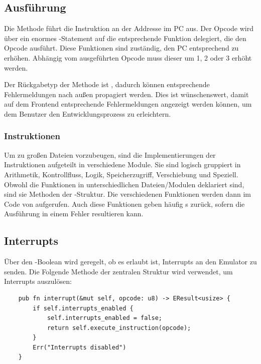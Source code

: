 \subsection{Ausführung}

Die  Methode führt die Instruktion an der Addresse im PC aus. Der Opcode wird über ein enormes -Statement auf die entsprechende Funktion delegiert, die den Opcode ausführt. Diese Funktionen sind zuständig, den \ac{PC} entsprechend zu erhöhen. Abhängig vom ausgeführten Opcode muss dieser um 1, 2 oder 3 erhöht werden.

Der Rückgabetyp der Methode ist , dadurch können entsprechende Fehlermeldungen nach außen propagiert werden. Dies ist wünschenswert, damit auf dem Frontend entsprechende Fehlermeldungen angezeigt werden können, um dem Benutzer den Entwicklungsprozess zu erleichtern.

\subsubsection{Instruktionen}

Um zu großen Dateien vorzubeugen, sind die Implementierungen der Instruktionen aufgeteilt in verschiedene Module. Sie sind logisch gruppiert in Arithmetik, Kontrollfluss, Logik, Speicherzugriff, Verschiebung und Speziell.
Obwohl die Funktionen in unterschiedlichen Dateien/Modulen deklariert sind, sind sie Methoden der -Struktur.
Die verschiedenen Funktionen werden dann im Code von  aufgerufen.
Auch diese Funktionen geben häufig s zurück, sofern die Ausführung in einem Fehler resultieren kann.

\subsection{Interrupts}

Über den -Boolean wird geregelt, ob es erlaubt ist, Interrupts an den Emulator zu senden. Die Folgende Methode der zentralen Struktur wird verwendet, um Interrupts auszulösen:

\begin{verbatim}
    pub fn interrupt(&mut self, opcode: u8) -> EResult<usize> {
        if self.interrupts_enabled {
            self.interrupts_enabled = false;
            return self.execute_instruction(opcode);
        }
        Err("Interrupts disabled")
    }
\end{verbatim}

